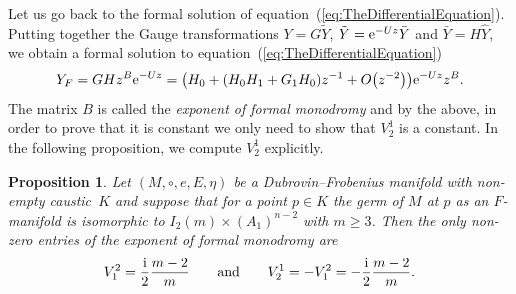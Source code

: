 \documentclass[pdftex]{sigma}
\numberwithin{equation}{section}
\newtheorem{Proposition}[Theorem]{Proposition}
 { \theoremstyle{definition}
\newtheorem{Definition}[Theorem]{Definition}
\newtheorem{Note}[Theorem]{Note}
\newtheorem{Example}[Theorem]{Example}
\newtheorem{Remark}[Theorem]{Remark} }
\begin{document}
 Let us go back to the formal solution of equation~(\ref{eq:TheDifferentialEquation}). Putting together the Gauge transformations $Y=G\tilde{Y}$, $\tilde{Y}={\rm e}^{-Uz}\bar{Y}$ and $\bar{Y}=H\hat{Y}$, we obtain a formal solution to equation~(\ref{eq:TheDifferentialEquation})%
 \begin{equation}
 \label{eq:FormalSolution}
 Y_{F}=GHz^{B}{\rm e}^{-Uz}=\bigl(H_{0}+(H_{0}H_{1}+G_{1}H_{0})z^{-1}+O\bigl(z^{-2}\bigr)\bigr){\rm e}^{-Uz}z^{B}.
 \end{equation}
 The matrix $B$ is called the \emph{exponent of formal monodromy} and by the above, in order to prove that it is constant we only need to show that $V^{1}_{2}$ is a constant. In the following proposition, we compute $V^{1}_{2}$ explicitly.
 \begin{Proposition}
 \label{prop:ExponentMultiplication}
 Let $(M,\circ,e,E,\eta)$ be a Dubrovin--Frobenius manifold with non-empty caustic~$K$ and suppose that for a point $p\in K$ the germ of $M$ at $p$ as an $F$-manifold is isomorphic to $I_{2}(m)\times(A_{1})^{n-2}$ with $m\geq 3$. Then the only non-zero entries of the exponent of formal monodromy are
 \begin{equation*}
 V^{2}_{1}=\frac{{\rm i}}{2}\frac{m-2}{m} \qquad \text{and} \qquad V^{1}_{2}=-V^{2}_{1}=-\frac{{\rm i}}{2}\frac{m-2}{m}.
 \end{equation*}
\end{Proposition}
\end{document}
